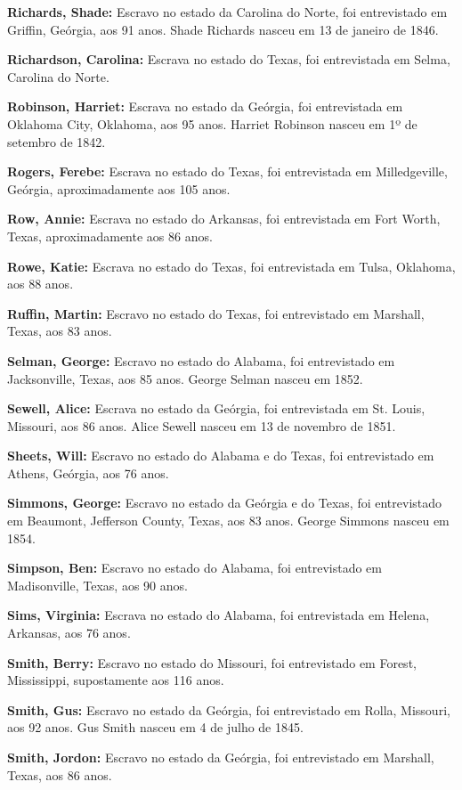 \textbf{Richards, Shade:} Escravo no estado da Carolina do Norte, foi
entrevistado em Griffin, Geórgia, aos 91 anos. Shade Richards nasceu em
13 de janeiro de 1846.

\textbf{Richardson, Carolina:} Escrava no estado do Texas, foi
entrevistada em Selma, Carolina do Norte.

\textbf{Robinson, Harriet:} Escrava no estado da Geórgia, foi
entrevistada em Oklahoma City, Oklahoma, aos 95 anos. Harriet Robinson
nasceu em 1º de setembro de 1842.

\textbf{Rogers, Ferebe:} Escrava no estado do Texas, foi entrevistada em
Milledgeville, Geórgia, aproximadamente aos 105 anos.

\textbf{Row, Annie:} Escrava no estado do Arkansas, foi entrevistada em
Fort Worth, Texas, aproximadamente aos 86 anos.

\textbf{Rowe, Katie:} Escrava no estado do Texas, foi entrevistada em
Tulsa, Oklahoma, aos 88 anos.

\textbf{Ruffin, Martin:} Escravo no estado do Texas, foi entrevistado em
Marshall, Texas, aos 83 anos.

\textbf{Selman, George:} Escravo no estado do Alabama, foi entrevistado
em Jacksonville, Texas, aos 85 anos. George Selman nasceu em 1852.

\textbf{Sewell, Alice:} Escrava no estado da Geórgia, foi entrevistada
em St. Louis, Missouri, aos 86 anos. Alice Sewell nasceu em 13 de
novembro de 1851.

\textbf{Sheets, Will:} Escravo no estado do Alabama e do Texas, foi
entrevistado em Athens, Geórgia, aos 76 anos.

\textbf{Simmons, George:} Escravo no estado da Geórgia e do Texas, foi
entrevistado em Beaumont, Jefferson County, Texas, aos 83 anos. George
Simmons nasceu em 1854.

\textbf{Simpson, Ben:} Escravo no estado do Alabama, foi entrevistado em
Madisonville, Texas, aos 90 anos.

\textbf{Sims, Virginia:} Escrava no estado do Alabama, foi entrevistada
em Helena, Arkansas, aos 76 anos.

\textbf{Smith, Berry:} Escravo no estado do Missouri, foi entrevistado
em Forest, Mississippi, supostamente aos 116 anos.

\textbf{Smith, Gus:} Escravo no estado da Geórgia, foi entrevistado em
Rolla, Missouri, aos 92 anos. Gus Smith nasceu em 4 de julho de 1845.

\textbf{Smith, Jordon:} Escravo no estado da Geórgia, foi entrevistado
em Marshall, Texas, aos 86 anos.

